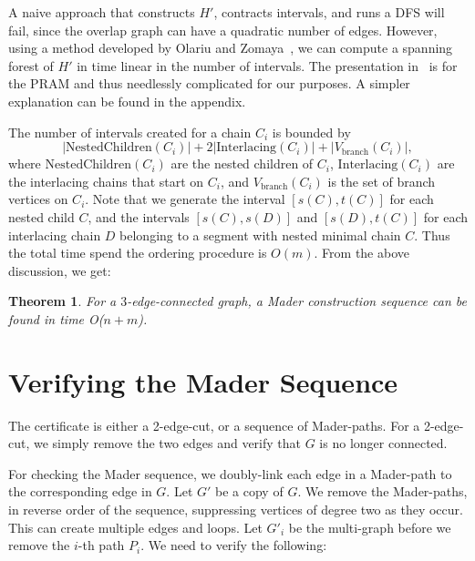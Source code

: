 \documentclass[paper=a4]{scrartcl}
\newtheorem{theorem}{Theorem}
\begin{document}
A naive approach that constructs $H'$, contracts intervals, and runs a DFS will fail, since the overlap graph can have a quadratic number of edges. However, using a method developed by Olariu and Zomaya~\cite{Olariu1996}, we can compute a spanning forest of $H'$ in time linear in the number of intervals. The presentation in~\cite{Olariu1996} is for the PRAM and thus needlessly complicated for our purposes. A simpler explanation can be found in the appendix.

The number of intervals created for a chain $C_i$ is bounded by
\[
	|\text{NestedChildren}(C_i)|+2|\text{Interlacing}(C_i)|+|V_{\text{branch}}(C_i)|,
\]
where $\text{NestedChildren}(C_i)$ are the nested children of $C_i$, $\text{Interlacing}(C_i)$ are the interlacing chains that start on $C_i$, and $V_{\text{branch}}(C_i)$ is the set of branch vertices on $C_i$. Note that we generate 
the interval $[s(C),t(C)]$ for each nested child $C$, and the intervals $[s(C),s(D)]$ and $[s(D),t(C)]$ for each interlacing chain $D$ belonging to a segment with nested minimal chain $C$. Thus the total time spend the ordering procedure is $O(m)$. 
From the above discussion, we get:

\begin{theorem}
For a $3$-edge-connected graph, a Mader construction sequence can be found in time O($n+m$).
\end{theorem}


\section{Verifying the Mader Sequence}\label{sec:verify mader}

The certificate is either a 2-edge-cut, or a sequence of Mader-paths. For a 2-edge-cut, we simply remove the two edges and verify that $G$ is no longer connected.

For checking the Mader sequence, we doubly-link each edge in a Mader-path to the corresponding edge in $G$. Let $G'$ be a copy of $G$. We remove the Mader-paths, in reverse order of the sequence, suppressing vertices of degree two as they occur. This can create multiple edges and loops. Let $G'_i$ be the multi-graph before we remove the $i$-th path $P_i$. We need to verify the following:
\end{document}
